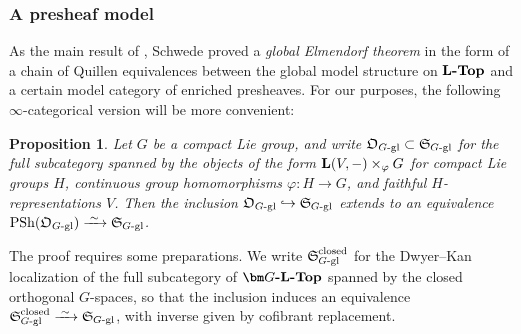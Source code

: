 \documentclass[reqno]{memo-l}
\theoremstyle{mythm}
\newtheorem{prop}[thm]{Proposition}
\theoremstyle{definition}
\numberwithin{equation}{section}
\renewcommand{\phi}{\varphi}
\DeclareMathOperator{\PSh}{PSh}
\newcommand{\cat}[1]{\textbf{\textup{#1}}}
\newcommand{\iso}{\xrightarrow{\;\smash{\raisebox{-0.25ex}{\ensuremath{\scriptstyle\sim}}}\;}}
\newcommand{\myS}{{{\mathfrak S\kern-.4pt}}}
\begin{document}
\subsubsection{A presheaf model}
As the main result of \cite{schwede_orbispaces_2020}, Schwede proved a \emph{global Elmendorf theorem} in the form of a chain of Quillen equivalences between the global model structure on $\cat{$\cat{L}$-Top}$ and a certain model category of enriched presheaves. For our purposes, the following $\infty$-categorical version will be more convenient:

\begin{prop}\label{prop:global-Elmendorf}
    Let $G$ be a compact Lie group, and write $\mathfrak O_\textup{$G$-gl}\subset\myS_\textup{$G$-gl}$ for the full subcategory spanned by the objects of the form $\cat{L}(V,-)\times_\phi G$ for compact Lie groups $H$, continuous group homomorphisms $\phi\colon H\to G$, and faithful $H$-representations $V$. Then the inclusion $\mathfrak O_\textup{$G$-gl}\hookrightarrow\myS_\textup{$G$-gl}$ extends to an equivalence $\PSh(\mathfrak O_\textup{$G$-gl})\iso\myS_\textup{$G$-gl}$.
\end{prop}

The proof requires some preparations. We write $\myS_\textup{$G$-gl}^\textup{closed}$ for the Dwyer--Kan localization of the full subcategory of $\cat{$\bm G$-$\cat{L}$-Top}$ spanned by the closed orthogonal $G$-spaces, so that the inclusion induces an equivalence $\myS_\text{$G$-gl}^\text{closed}\iso\myS_\text{$G$-gl}$, with inverse given by cofibrant replacement.
\end{document}

